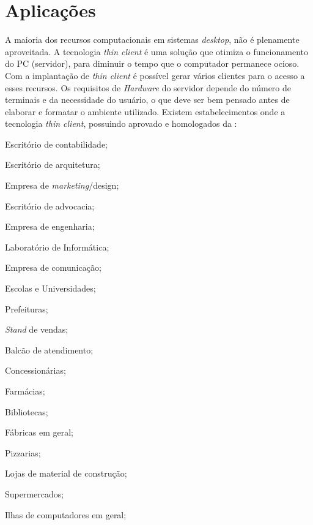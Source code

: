 \documentclass[
	12pt,				%
	openright,			%
	twoside,			%
	a4paper,			%
	chapter=TITLE,		%
	english,			%
	brazil				%
	]{abntex2}
\begin{document}
\newpage







\section{Aplicações}

A maioria dos recursos computacionais em sistemas \textit{desktop}, não é plenamente aproveitada. A tecnologia \textit{thin client} é uma solução que otimiza o funcionamento do PC (servidor), para diminuir o tempo que o computador permanece ocioso. Com a implantação de \textit{thin client} é possível gerar vários clientes para o acesso a esses recursos. Os requisitos de \textit{Hardware} do servidor depende do número de terminais e da necessidade do usuário, o que deve ser bem pensado antes de elaborar e formatar o ambiente utilizado. Existem estabelecimentos onde a tecnologia \textit{thin client}, possuindo aprovado e homologados da :

\begin{alineas}
\item Escritório de contabilidade;
\item Escritório de arquitetura;
\item Empresa de \textit{marketing}/design;
\item Escritório de advocacia;
\item Empresa de engenharia;
\item Laboratório de Informática;
\item Empresa de comunicação;
\item Escolas e Universidades;
\item Prefeituras;
\item \textit{Stand} de vendas;
\item Balcão de atendimento;
\item Concessionárias;
\item Farmácias;
\item Bibliotecas;
\item Fábricas em geral;
\item Pizzarias;
\item Lojas de material de construção;
\item Supermercados;
\item Ilhas de computadores em geral;
\end{alineas}
\end{document}

